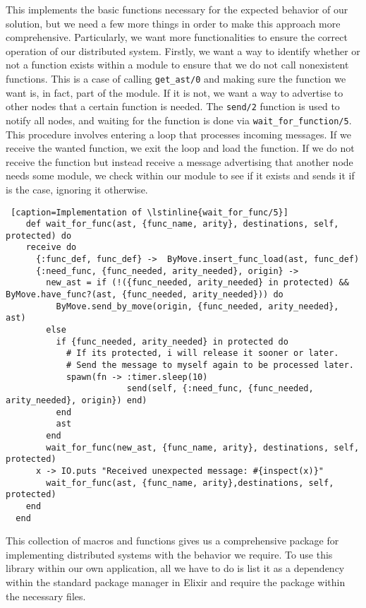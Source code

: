 This implements the basic functions necessary for the expected behavior of our solution, but we need a few more things in order to make this approach more comprehensive. Particularly, we want more functionalities to ensure the correct operation of our distributed system. Firstly, we want a way to identify whether or not a function exists within a module to ensure that we do not call nonexistent functions. This is a case of calling \lstinline{get_ast/0} and making sure the function we want is, in fact, part of the module. If it is not, we want a way to advertise to other nodes that a certain function is needed. The \lstinline{send/2} function is used to notify all nodes, and waiting for the function is done via \lstinline{wait_for_function/5}. This procedure involves entering a loop that processes incoming messages. If we receive the wanted function, we exit the loop and load the function. If we do not receive the function but instead receive a message advertising that another node needs some module, we check within our module to see if it exists and sends it if is the case, ignoring it otherwise. 

\begin{lstlisting} [caption=Implementation of \lstinline{wait_for_func/5}]
    def wait_for_func(ast, {func_name, arity}, destinations, self, protected) do
    receive do
      {:func_def, func_def} ->  ByMove.insert_func_load(ast, func_def)
      {:need_func, {func_needed, arity_needed}, origin} ->
        new_ast = if (!({func_needed, arity_needed} in protected) && ByMove.have_func?(ast, {func_needed, arity_needed})) do
          ByMove.send_by_move(origin, {func_needed, arity_needed}, ast)
        else
          if {func_needed, arity_needed} in protected do
            # If its protected, i will release it sooner or later. 
            # Send the message to myself again to be processed later.
            spawn(fn -> :timer.sleep(10)
                        send(self, {:need_func, {func_needed, arity_needed}, origin}) end)
          end
          ast
        end
        wait_for_func(new_ast, {func_name, arity}, destinations, self, protected)
      x -> IO.puts "Received unexpected message: #{inspect(x)}"
        wait_for_func(ast, {func_name, arity},destinations, self, protected)
    end
  end
\end{lstlisting}


This collection of macros and functions gives us a comprehensive package for implementing distributed systems with the behavior we require. To use this library within our own application, all we have to do is list it as a dependency within the standard package manager in Elixir and require the package within the necessary files.